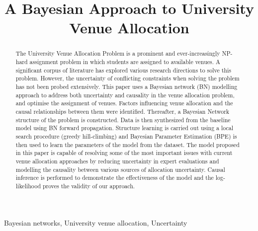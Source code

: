 \documentclass[conference]{IEEEtran}
\begin{document}
\title{A Bayesian Approach to University Venue Allocation
}

\author{
\and
{}
}
\maketitle

\begin{abstract}
The University Venue Allocation Problem is a prominent and ever-increasingly NP-hard assignment problem in which students are assigned to available venues. A significant corpus of literature has explored various research directions to solve this problem. However, the uncertainty of conflicting constraints when solving the problem has not been probed extensively. This paper uses a Bayesian network (BN) modelling approach to address both uncertainty and causality in the venue allocation problem, and optimise the assignment of venues. Factors influencing venue allocation and the causal relationships between them were identified. Thereafter, a Bayesian Network structure of the problem is constructed. Data is then synthesized from the baseline model using BN forward propagation. Structure learning is carried out using a local search procedure (greedy hill-climbing) and Bayesian Parameter Estimation (BPE) is then used to learn the parameters of the model from the dataset. The model proposed in this paper is capable of resolving some of the most important issues with current venue allocation approaches by reducing uncertainty in expert evaluations and  modelling the causality between various sources of allocation uncertainty. Causal inference is performed to demonstrate the effectiveness of the model and the log-likelihood proves the validity of our approach.
\end{abstract}
\begin{IEEEkeywords}
Bayesian networks, University venue allocation, Uncertainty
\end{IEEEkeywords}
\end{document}
